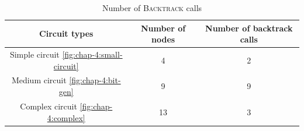 \begin{table}[h!]
    \centering
    \begin{tabular}{|c|c|c|}
        \hline
        \rowcolor[HTML]{EAE1E1}
        {\color[HTML]{333333} \textbf{Circuit types}} & {\color[HTML]{333333} \textbf{Number of nodes}} & {\color[HTML]{333333} \textbf{Number of backtrack calls}} \\ \hline
        Simple circuit \ref{fig:chap-4:small-circuit} & 4                                               & 2                                                         \\
        Medium circuit  \ref{fig:chap-4:bit-gen}      & 9                                               & 9                                                         \\
        Complex circuit \ref{fig:chap-4:complex}      & 13                                              & 3                                                         \\ \hline
    \end{tabular}
    \caption{Number of \textsc{Backtrack} calls}
    \label{tab:chap-4:running-time-analysis}
\end{table}

